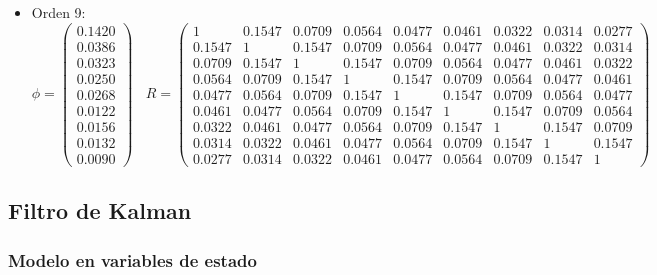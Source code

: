 \begin{itemize}
\item Orden 9:
\begin{equation*}
	\phi = 
	\begin{pmatrix}
		0.1420 \\
		0.0386 \\
		0.0323 \\
		0.0250 \\
		0.0268 \\
		0.0122 \\
		0.0156 \\
		0.0132 \\
		0.0090
	\end{pmatrix}	\	\	\	\
	R =
	\begin{pmatrix}	
	1 & 0.1547 & 0.0709 & 0.0564 & 0.0477 & 0.0461 & 0.0322 & 0.0314 & 0.0277 \\
	0.1547 & 1 & 0.1547 & 0.0709 & 0.0564 & 0.0477 & 0.0461 & 0.0322 & 0.0314 \\
	0.0709 & 0.1547 & 1 & 0.1547 & 0.0709 & 0.0564 & 0.0477 & 0.0461 & 0.0322 \\
	0.0564 & 0.0709 & 0.1547 & 1 & 0.1547 & 0.0709 & 0.0564 & 0.0477 & 0.0461 \\
	0.0477 & 0.0564 & 0.0709 & 0.1547 & 1 & 0.1547 & 0.0709 & 0.0564 & 0.0477 \\
	0.0461 & 0.0477 & 0.0564 & 0.0709 & 0.1547 & 1 & 0.1547 & 0.0709 & 0.0564 \\
	0.0322 & 0.0461 & 0.0477 & 0.0564 & 0.0709 & 0.1547 & 1 & 0.1547 & 0.0709 \\
	0.0314 & 0.0322 & 0.0461 & 0.0477 & 0.0564 & 0.0709 & 0.1547 & 1 & 0.1547 \\
	0.0277 & 0.0314 & 0.0322 & 0.0461 & 0.0477 & 0.0564 & 0.0709 & 0.1547 & 1	  
	\end{pmatrix}
\end{equation*}

\end{itemize}

\subsection{Filtro de Kalman}
\subsubsection{Modelo en variables de estado}
